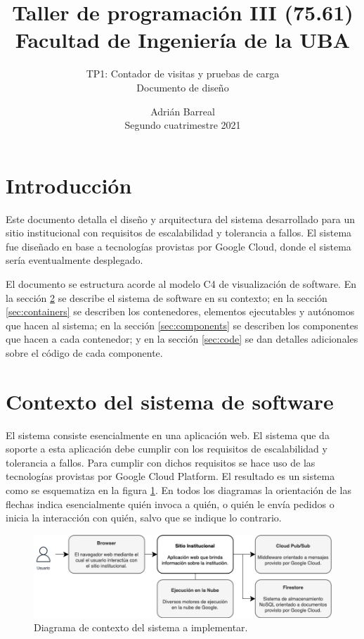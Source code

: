\documentclass[11pt]{scrartcl}
\title{Taller de programación III (75.61)\\[0.2em]\Large{Facultad de Ingeniería de la UBA}\\[1em]}
\subtitle{\huge{TP1: Contador de visitas y pruebas de carga\\[0.2em]Documento de diseño}}
\author{Adrián Barreal\\\small{Segundo cuatrimestre 2021}}
\date{}
\begin{document}
\maketitle
\tableofcontents
\newpage

\section{Introducción}

Este documento detalla el diseño y arquitectura del sistema desarrollado para un sitio 
institucional con requisitos de escalabilidad y tolerancia a fallos. El sistema fue diseñado en base
a tecnologías provistas por Google Cloud, donde el sistema sería eventualmente desplegado.

El documento se estructura acorde al modelo C4 de visualización de software.
En la sección \ref{sec:system} se describe el sistema de software en su contexto;
en la sección \ref{sec:containers} se describen los contenedores, 
elementos ejecutables y autónomos que hacen al sistema;
en la sección \ref{sec:components} se describen los componentes que hacen a cada contenedor;
y en la sección \ref{sec:code} se dan detalles adicionales sobre el código de cada componente.

\section{Contexto del sistema de software}\label{sec:system}

El sistema consiste esencialmente en una aplicación web. El sistema que da soporte a esta aplicación debe cumplir con los requisitos de escalabilidad y tolerancia a fallos. Para cumplir con dichos requisitos se hace uso de las tecnologías provistas por Google Cloud Platform. El resultado es un sistema como se esquematiza en la figura \ref{fig:system}. En todos los diagramas la orientación de las flechas indica esencialmente quién invoca a quién, o quién le envía pedidos o inicia la interacción con quién, salvo que se indique lo contrario.

\begin{figure}
\centering
\includegraphics[scale=0.44]{img/context}
\caption{Diagrama de contexto del sistema a implementar.}
\label{fig:system}
\end{figure}
\end{document}
